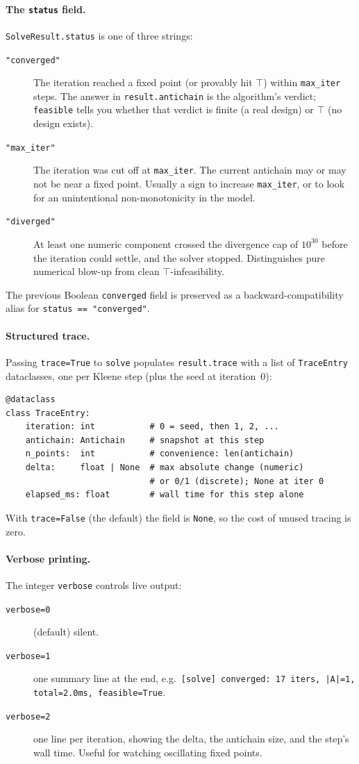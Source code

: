 \documentclass[11pt,a4paper]{article}
\begin{document}
\paragraph{The \texttt{status} field.} \texttt{SolveResult.status} is
one of three strings:
\begin{description}
\item[\texttt{"converged"}] The iteration reached a fixed point (or
provably hit $\top$) within \texttt{max\_iter} steps. The answer in
\texttt{result.antichain} is the algorithm's verdict; \texttt{feasible}
tells you whether that verdict is finite (a real design) or $\top$
(no design exists).
\item[\texttt{"max\_iter"}] The iteration was cut off at
\texttt{max\_iter}. The current antichain may or may not be near a
fixed point. Usually a sign to increase \texttt{max\_iter}, or to look
for an unintentional non-monotonicity in the model.
\item[\texttt{"diverged"}] At least one numeric component crossed the
divergence cap of $10^{30}$ before the iteration could settle, and the
solver stopped. Distinguishes pure numerical blow-up from clean
$\top$-infeasibility.
\end{description}
The previous Boolean \texttt{converged} field is preserved as a
backward-compatibility alias for \texttt{status == "converged"}.

\paragraph{Structured trace.} Passing \texttt{trace=True} to
\texttt{solve} populates \texttt{result.trace} with a list of
\texttt{TraceEntry} dataclasses, one per Kleene step (plus the seed at
iteration~0):
\begin{lstlisting}
@dataclass
class TraceEntry:
    iteration: int           # 0 = seed, then 1, 2, ...
    antichain: Antichain     # snapshot at this step
    n_points:  int           # convenience: len(antichain)
    delta:     float | None  # max absolute change (numeric)
                             # or 0/1 (discrete); None at iter 0
    elapsed_ms: float        # wall time for this step alone
\end{lstlisting}
With \texttt{trace=False} (the default) the field is \texttt{None}, so
the cost of unused tracing is zero.

\paragraph{Verbose printing.} The integer \texttt{verbose} controls
live output:
\begin{description}
\item[\texttt{verbose=0}] (default) silent.
\item[\texttt{verbose=1}] one summary line at the end, e.g.\
\texttt{[solve] converged: 17 iters, |A|=1, total=2.0ms, feasible=True}.
\item[\texttt{verbose=2}] one line per iteration, showing the delta,
the antichain size, and the step's wall time. Useful for watching
oscillating fixed points.
\end{description}
\end{document}
